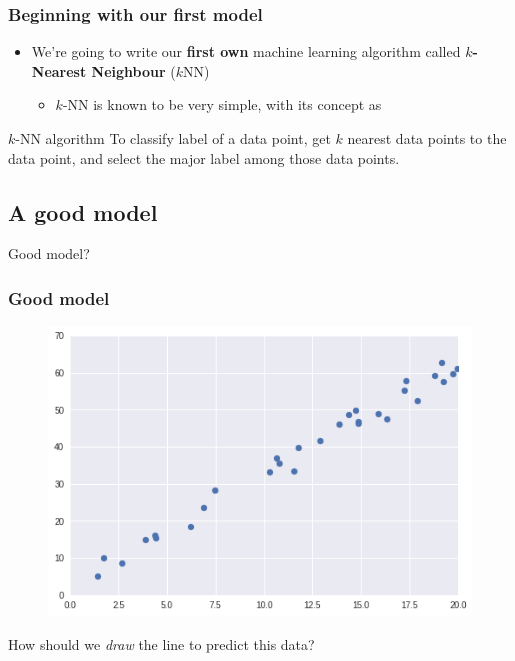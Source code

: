 \documentclass[]{beamer}
\begin{document}
\begin{frame}
    \frametitle{Beginning with our first model}
    \begin{itemize}
        \item<2-> We're going to write our \textbf{first own} machine learning algorithm called \textbf{$k$-Nearest Neighbour} ($k$NN)
        \begin{itemize}
            \item<3-> $k$-NN is known to be very simple, with its concept as
        \end{itemize}
    \end{itemize}
    \begin{block}{$k$-NN algorithm}
        To classify label of a data point, get $k$ nearest data points to the data point, and select the major label among those data points.
    \end{block}
\end{frame}

\subsection{A good model}
\begin{frame}
	\begin{center}
		{\Huge Good model?}\\
	\end{center}
\end{frame}

\begin{frame}
	\frametitle{Good model}
	\begin{figure}
		\includegraphics[scale=.4]{imgs/linreg_1.png}
	\end{figure}
	\begin{center}
		How should we \textit{draw} the line to predict this data?
	\end{center}
\end{frame}
\end{document}
